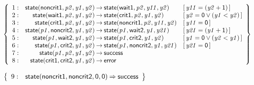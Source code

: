 \documentclass[a4paper]{article}
\def\lthtmlcheckvsize{\ifdim\ht\sizebox<\vsize 
  \ifdim\wd\sizebox<\hsize\expandafter\hfill\fi \expandafter\vfill
  \else\expandafter\vss\fi}%
\begin{document}
{\newpage\clearpage
{}%
$\displaystyle \left\{
\begin{array}{rr@{\>}c@{\>}ll}
\mathrm{1} : 
 & \mathsf{state}(\mathsf{noncrit1},\mathit{p2},\mathit{y1},\mathit{y2})
 & \to 
 & \mathsf{state}(\mathsf{wait1},\mathit{p2},\mathit{y11},\mathit{y2})
 & [\, \mathit{y11} = (\mathit{y2} + \mathsf{1}) \,]\\
\par
\mathrm{2} : 
 & \mathsf{state}(\mathsf{wait1},\mathit{p2},\mathit{y1},\mathit{y2})
 & \to 
 & \mathsf{state}(\mathsf{crit1},\mathit{p2},\mathit{y1},\mathit{y2})
 & [\, \mathit{y2} = \mathsf{0} \lor (\mathit{y1} < \mathit{y2}) \,]\\
\par
\mathrm{3} : 
 & \mathsf{state}(\mathsf{crit1},\mathit{p2},\mathit{y1},\mathit{y2})
 & \to 
 & \mathsf{state}(\mathsf{noncrit1},\mathit{p2},\mathit{y11},\mathit{y2})
 & [\, \mathit{y11} = \mathsf{0} \,]\\
\par
\mathrm{4} : 
 & \mathsf{state}(\mathit{p1},\mathsf{noncrit2},\mathit{y1},\mathit{y2})
 & \to 
 & \mathsf{state}(\mathit{p1},\mathsf{wait2},\mathit{y1},\mathit{y21})
 & [\, \mathit{y21} = (\mathit{y1} + \mathsf{1}) \,]\\
\par
\mathrm{5} : 
 & \mathsf{state}(\mathit{p1},\mathsf{wait2},\mathit{y1},\mathit{y2})
 & \to 
 & \mathsf{state}(\mathit{p1},\mathsf{crit2},\mathit{y1},\mathit{y2})
 & [\, \mathit{y1} = \mathsf{0} \lor (\mathit{y2} < \mathit{y1}) \,]\\
\par
\mathrm{6} : 
 & \mathsf{state}(\mathit{p1},\mathsf{crit2},\mathit{y1},\mathit{y2})
 & \to 
 & \mathsf{state}(\mathit{p1},\mathsf{noncrit2},\mathit{y1},\mathit{y21})
 & [\, \mathit{y21} = \mathsf{0} \,]\\
\par
\mathrm{7} : 
 & \mathsf{state}(\mathit{p1},\mathit{p2},\mathit{y1},\mathit{y2})
 & \to 
 & \mathsf{success}\\
\par
\mathrm{8} : 
 & \mathsf{state}(\mathsf{crit1},\mathsf{crit2},\mathit{y1},\mathit{y2})
 & \to 
 & \mathsf{error}\\
\par
\end{array}
\right\}
$%
\lthtmlindisplaymathZ
\lthtmlcheckvsize\clearpage}

{\newpage\clearpage
{}%
$\displaystyle \left\{
\begin{array}{rr@{\>}c@{\>}ll}
\par
\mathrm{9} : 
 & \mathsf{state}(\mathsf{noncrit1},\mathsf{noncrit2},\mathsf{0},\mathsf{0})
 & \Rightarrow 
 & \mathsf{success}\\
\par
\end{array}
\right\}
$%
\lthtmlindisplaymathZ
\lthtmlcheckvsize\clearpage}
\end{document}
